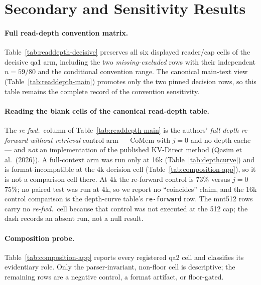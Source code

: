\section{Secondary and Sensitivity Results}
\label{app:secondary}

\FloatBarrier

\paragraph{Full read-depth convention matrix.}
Table~\ref{tab:readdepth-decisive} preserves all six displayed reader/cap cells
of the decisive qa1 arm, including the two \emph{missing-excluded} rows with
their independent $n=59/80$ and the conditional convention range.  The canonical
main-text view (Table~\ref{tab:readdepth-main}) promotes only the two pinned
decision rows, so this table remains the complete record of the convention
sensitivity.

\paragraph{Reading the blank cells of the canonical read-depth table.}
The \emph{re-fwd.}\ column of Table~\ref{tab:readdepth-main} is the authors'
\emph{full-depth re-forward without retrieval} control arm --- CoMem with
$j{=}0$ and no depth cache --- and \emph{not} an implementation of the published
KV-Direct method (Qasim et al.\ (2026)).  A full-context arm was run only at 16k
(Table~\ref{tab:depthcurve}) and is format-incompatible at the 4k decision cell
(Table~\ref{tab:composition-app}), so it is not a comparison cell there.  At 4k
the re-forward control is $73\%$ versus $j{=}0$ $75\%$; no paired test was run at
4k, so we report no ``coincides'' claim, and the 16k control comparison is the
depth-curve table's \texttt{re-forward} row.  The mnt512 rows carry no
\emph{re-fwd.}\ cell because that control was not executed at the 512 cap; the
dash records an absent run, not a null result.



\FloatBarrier

\paragraph{Composition probe.}
Table~\ref{tab:composition-app} reports every registered qa2 cell and classifies
its evidentiary role.  Only the parser-invariant, non-floor cell is descriptive;
the remaining rows are a negative control, a format artifact, or floor-gated.

